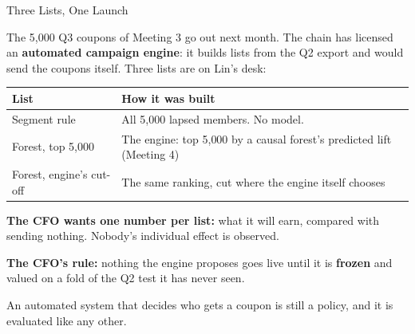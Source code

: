 \documentclass[aspectratio=169, 11pt, handout]{beamer}
\begin{document}
\begin{frame}{Three Lists, One Launch}

The 5{,}000 Q3 coupons of Meeting 3 go out next month. The chain has licensed an \textbf{automated campaign engine}: it builds lists from the Q2 export and would send the coupons itself. Three lists are on Lin's desk:

\begin{center}
\small
\begin{tabular}{lp{8.4cm}}
\toprule
\textbf{List} & \textbf{How it was built} \\
\midrule
Segment rule & All 5{,}000 lapsed members. No model. \\
Forest, top 5{,}000 & The engine: top 5{,}000 by a causal forest's predicted lift (Meeting 4) \\
Forest, engine's cut-off & The same ranking, cut where the engine itself chooses \\
\bottomrule
\end{tabular}
\end{center}

\medskip

\textbf{The CFO wants one number per list:} what it will earn, compared with sending nothing. Nobody's individual effect is observed.

\medskip

\textbf{The CFO's rule:} nothing the engine proposes goes live until it is \textbf{frozen} and valued on a fold of the Q2 test it has never seen.

\medskip

\small An automated system that decides who gets a coupon is still a policy, and it is evaluated like any other.
\end{frame}
\end{document}
